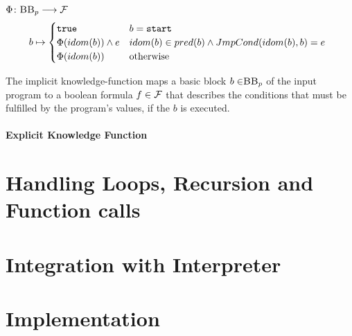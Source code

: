 \begin{definition} 
    \begin{center}
        $\Phi\colon \mbb_p \longrightarrow \mbform$ \\
        \begin{equation*}
            b \mapsto
        \begin{cases}
            \mttt & b = \mathtt{start} \\
            \Phi(idom(b)) \land e & \parbox[t]{.6\textwidth}{$idom(b) \in pred(b) \land JmpCond(idom(b), b) = e$}\\ 
            \Phi(idom(b)) & \text{otherwise}\\ 
        \end{cases}
        \end{equation*}
    \end{center}
    The implicit knowledge-function maps a basic block $b \in \mbb_p$ of the input program \p to a boolean formula $f \in \mathcal{F}$ that describes the conditions that must be fulfilled by the program's values, if the $b$ is executed.
\end{definition}



\paragraph{Explicit Knowledge Function}


\section{Handling Loops, Recursion and Function calls}

\section{Integration with Interpreter}

\section{Implementation}